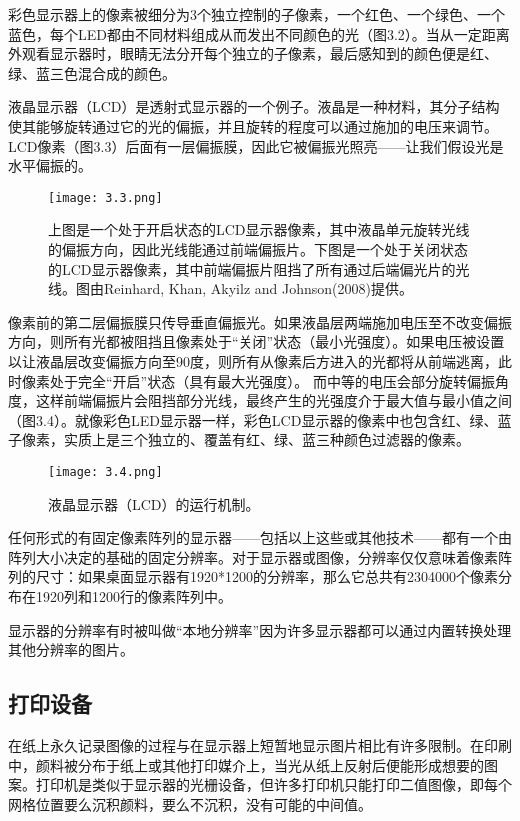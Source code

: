 \documentclass[lang=cn,12pt]{elegantbook}
\begin{document}
彩色显示器上的像素被细分为3个独立控制的子像素，一个红色、一个绿色、一个蓝色，每个LED都由不同材料组成从而发出不同颜色的光（图3.2）。当从一定距离外观看显示器时，眼睛无法分开每个独立的子像素，最后感知到的颜色便是红、绿、蓝三色混合成的颜色。

液晶显示器（LCD）是透射式显示器的一个例子。液晶是一种材料，其分子结构使其能够旋转通过它的光的偏振，并且旋转的程度可以通过施加的电压来调节。LCD像素（图3.3）后面有一层偏振膜，因此它被偏振光照亮——让我们假设光是水平偏振的。

\begin{figure}[htb]
\centering
\texttt{[image: 3.3.png]}
\caption{上图是一个处于开启状态的LCD显示器像素，其中液晶单元旋转光线的偏振方向，因此光线能通过前端偏振片。下图是一个处于关闭状态的LCD显示器像素，其中前端偏振片阻挡了所有通过后端偏光片的光线。图由Reinhard, Khan, Akyilz and Johnson(2008)提供。}
\end{figure}

像素前的第二层偏振膜只传导垂直偏振光。如果液晶层两端施加电压至不改变偏振方向，则所有光都被阻挡且像素处于“关闭”状态（最小光强度）。如果电压被设置以让液晶层改变偏振方向至90度，则所有从像素后方进入的光都将从前端逃离，此时像素处于完全“开启”状态（具有最大光强度）。 而中等的电压会部分旋转偏振角度，这样前端偏振片会阻挡部分光线，最终产生的光强度介于最大值与最小值之间（图3.4）。就像彩色LED显示器一样，彩色LCD显示器的像素中也包含红、绿、蓝子像素，实质上是三个独立的、覆盖有红、绿、蓝三种颜色过滤器的像素。

\begin{figure}[htb]
\centering
\texttt{[image: 3.4.png]}
\caption{液晶显示器（LCD）的运行机制。}
\end{figure}

任何形式的有固定像素阵列的显示器——包括以上这些或其他技术——都有一个由阵列大小决定的基础的固定分辨率。对于显示器或图像，分辨率仅仅意味着像素阵列的尺寸：如果桌面显示器有1920*1200的分辨率，那么它总共有2304000个像素分布在1920列和1200行的像素阵列中。

\begin{note}
显示器的分辨率有时被叫做“本地分辨率”因为许多显示器都可以通过内置转换处理其他分辨率的图片。
\end{note}

\subsection{打印设备}

在纸上永久记录图像的过程与在显示器上短暂地显示图片相比有许多限制。在印刷中，颜料被分布于纸上或其他打印媒介上，当光从纸上反射后便能形成想要的图案。打印机是类似于显示器的光栅设备，但许多打印机只能打印二值图像，即每个网格位置要么沉积颜料，要么不沉积，没有可能的中间值。
\end{document}
